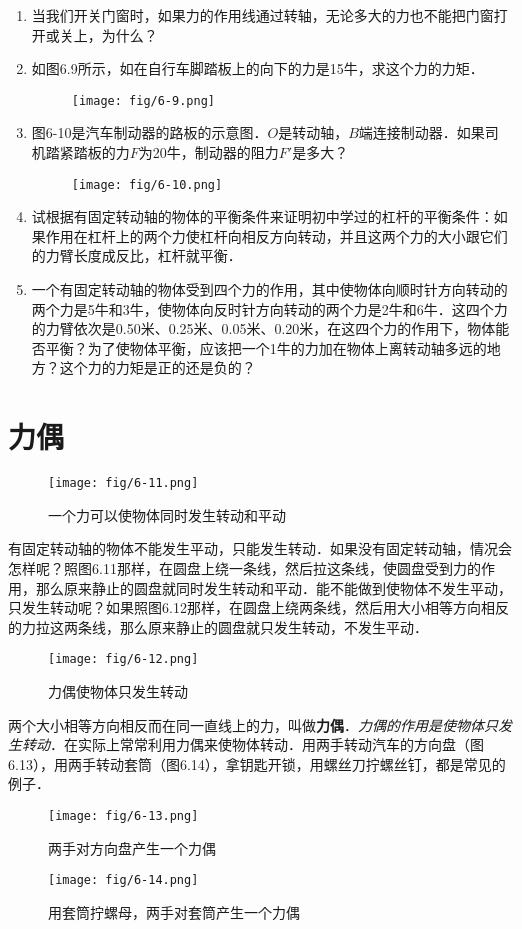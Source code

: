 \begin{enumerate}
    \item 当我们开关门窗时，如果力的作用线通过转轴，无论多大的力也不能把门窗打开或关上，为什么？
    \item 如图6.9所示，如在自行车脚踏板上的向下的力是15牛，求这个力的力矩．
\begin{figure}[htp]
\centering\texttt{[image: fig/6-9.png]}
\caption{}
\end{figure}
    \item 图6-10是汽车制动器的路板的示意图．$O$是转动轴，$B$端连接制动器．如果司机踏紧踏板的力$F$为20牛，制动器的阻力$F'$是多大？
\begin{figure}[htp]
\centering\texttt{[image: fig/6-10.png]}
\caption{}
\end{figure}
    \item 试根据有固定转动轴的物体的平衡条件来证明初中学过的杠杆的平衡条件：如果作用在杠杆上的两个力使杠杆向相反方向转动，并且这两个力的大小跟它们的力臂长度成反比，杠杆就平衡．
    \item 一个有固定转动轴的物体受到四个力的作用，其中使物体向顺时针方向转动的两个力是5牛和3牛，使物体向反时针方向转动的两个力是2牛和6牛．这四个力的力臂依次是0.50米、0.25米、0.05米、0.20米，在这四个力的作用下，物体能否平衡？为了使物体平衡，应该把一个1牛的力加在物体上离转动轴多远的地方？这个力的力矩是正的还是负的？
\end{enumerate}


\section{力偶}
\begin{figure}[htp]
\centering\texttt{[image: fig/6-11.png]}
\caption{一个力可以使物体同时发生转动和平动}
\end{figure}
有固定转动轴的物体不能发生平动，只能发生转动．如果没有固定转动轴，情况会怎样呢？照图6.11那样，在圆盘上绕一条线，然后拉这条线，使圆盘受到力的作用，那么原来静止的圆盘就同时发生转动和平动．能不能做到使物体不发生平动，只发生转动呢？如果照图6.12那样，在圆盘上绕两条线，然后用大小相等方向相反的力拉这两条线，那么原来静止的圆盘就只发生转动，不发生平动．

\begin{figure}[htp]
\centering\texttt{[image: fig/6-12.png]}
\caption{力偶使物体只发生转动}
\end{figure}

两个大小相等方向相反而在同一直线上的力，叫做\textbf{力偶}．\textit{力偶的作用是使物体只发生转动}．在实际上常常利用力偶来使物体转动．用两手转动汽车的方向盘（图6.13），用两手转动套筒（图6.14），拿钥匙开锁，用螺丝刀拧螺丝钉，都是常见的例子．
\begin{figure}[htp]
\centering\texttt{[image: fig/6-13.png]}
\caption{两手对方向盘产生一个力偶}
\end{figure}
\begin{figure}[htp]
\centering\texttt{[image: fig/6-14.png]}
\caption{用套筒拧螺母，两手对套筒产生一个力偶}
\end{figure}

